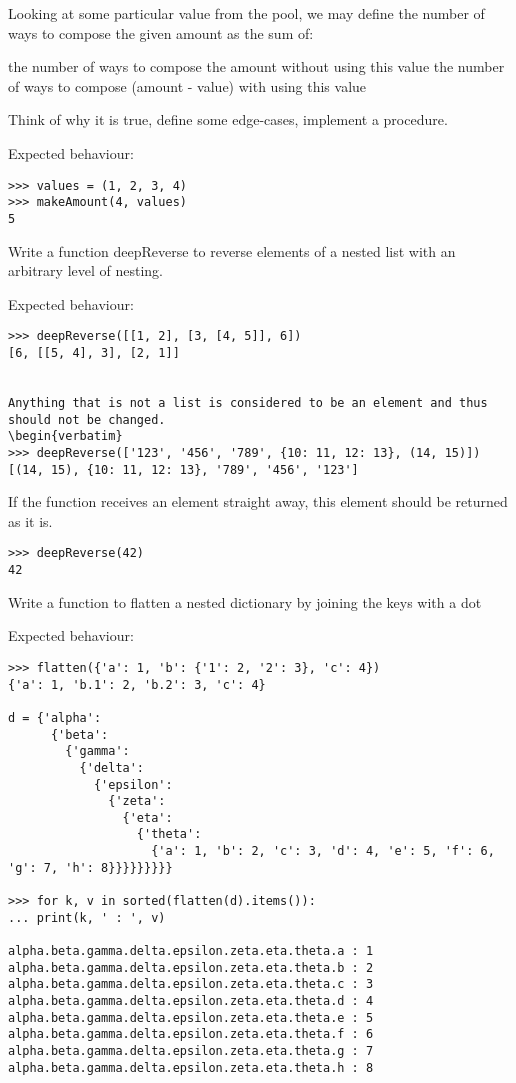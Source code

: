 \documentclass[]{article}
\begin{document}
Looking at some particular value from the pool, we may define the number of  ways to compose the given amount as the sum of:

     the number of ways to compose the amount without using this value
    the number of ways to compose (amount - value) with using this value


Think of why it is true, define some edge-cases, implement a procedure.

Expected behaviour: 
\begin{verbatim}
>>> values = (1, 2, 3, 4)
>>> makeAmount(4, values)
5
\end{verbatim}
\item
Write a function deepReverse to reverse elements of a nested list with an arbitrary level of nesting.

Expected behaviour:
\begin{verbatim}
>>> deepReverse([[1, 2], [3, [4, 5]], 6])
[6, [[5, 4], 3], [2, 1]]


Anything that is not a list is considered to be an element and thus should not be changed.
\begin{verbatim}
>>> deepReverse(['123', '456', '789', {10: 11, 12: 13}, (14, 15)])
[(14, 15), {10: 11, 12: 13}, '789', '456', '123']
\end{verbatim}

If the function receives an element straight away, this element should be returned as it is.
\begin{verbatim}
>>> deepReverse(42)
42
\end{verbatim}
\item

Write a function to flatten a nested dictionary by joining the keys with a dot

Expected behaviour:
\begin{verbatim}
>>> flatten({'a': 1, 'b': {'1': 2, '2': 3}, 'c': 4})
{'a': 1, 'b.1': 2, 'b.2': 3, 'c': 4}

d = {'alpha': 
      {'beta': 
        {'gamma': 
          {'delta': 
            {'epsilon': 
              {'zeta': 
                {'eta': 
                  {'theta': 
                    {'a': 1, 'b': 2, 'c': 3, 'd': 4, 'e': 5, 'f': 6, 'g': 7, 'h': 8}}}}}}}}}
                    
>>> for k, v in sorted(flatten(d).items()): 
... print(k, ' : ', v) 

alpha.beta.gamma.delta.epsilon.zeta.eta.theta.a : 1
alpha.beta.gamma.delta.epsilon.zeta.eta.theta.b : 2
alpha.beta.gamma.delta.epsilon.zeta.eta.theta.c : 3
alpha.beta.gamma.delta.epsilon.zeta.eta.theta.d : 4
alpha.beta.gamma.delta.epsilon.zeta.eta.theta.e : 5
alpha.beta.gamma.delta.epsilon.zeta.eta.theta.f : 6
alpha.beta.gamma.delta.epsilon.zeta.eta.theta.g : 7
alpha.beta.gamma.delta.epsilon.zeta.eta.theta.h : 8
\end{verbatim}
\end{document}
